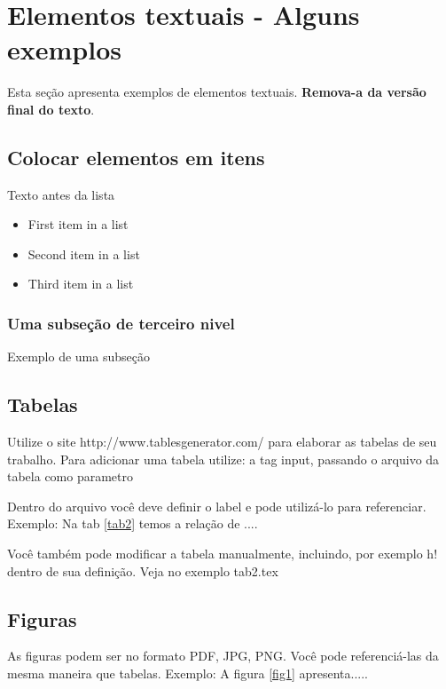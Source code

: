 \documentclass[	DIV=calc,%
							paper=a4,%
							fontsize=12pt,%
							onecolumn]{scrartcl}	 					%
\begin{document}
\section{Elementos textuais - Alguns exemplos}

Esta seção apresenta exemplos de elementos textuais. \textbf{Remova-a da versão final do texto}.


\subsection{Colocar elementos em itens}

Texto antes da lista

\begin{itemize}
	\item First item in a list 
	\item Second item in a list 
	\item Third item in a list
\end{itemize}

\subsubsection{Uma subseção de terceiro nivel}

Exemplo de uma subseção

\subsection{Tabelas}

Utilize o site http://www.tablesgenerator.com/ para elaborar as tabelas de seu trabalho.
Para adicionar uma tabela utilize: a tag input, passando o arquivo da tabela como parametro



Dentro do arquivo você deve definir o label e pode utilizá-lo para referenciar. Exemplo:
Na tab \ref{tab2} temos a relação de ....


Você também pode modificar a tabela manualmente, incluindo, por exemplo h! dentro de sua definição. Veja no exemplo tab2.tex

\subsection{Figuras}

As figuras podem ser no formato PDF, JPG, PNG. Você pode referenciá-las da mesma maneira que tabelas. Exemplo: A figura \ref{fig1} apresenta.....
\end{document}

